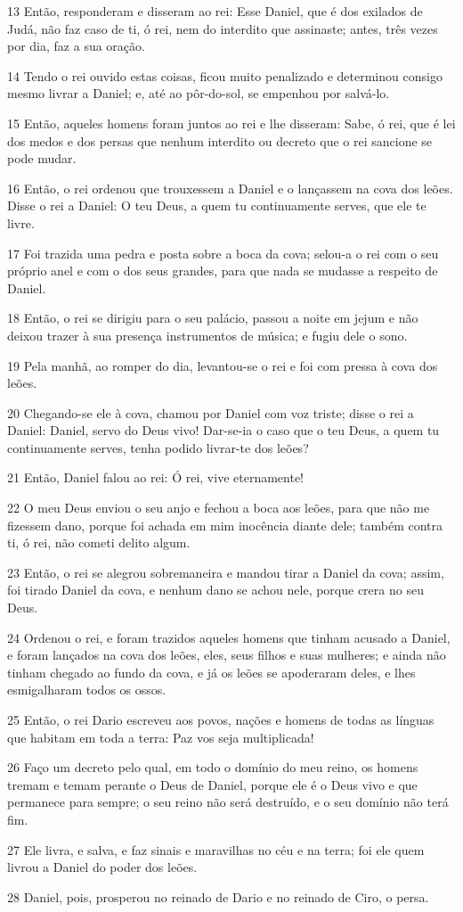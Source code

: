 \par 13 Então, responderam e disseram ao rei: Esse Daniel, que é dos exilados de Judá, não faz caso de ti, ó rei, nem do interdito que assinaste; antes, três vezes por dia, faz a sua oração.
\par 14 Tendo o rei ouvido estas coisas, ficou muito penalizado e determinou consigo mesmo livrar a Daniel; e, até ao pôr-do-sol, se empenhou por salvá-lo.
\par 15 Então, aqueles homens foram juntos ao rei e lhe disseram: Sabe, ó rei, que é lei dos medos e dos persas que nenhum interdito ou decreto que o rei sancione se pode mudar.
\par 16 Então, o rei ordenou que trouxessem a Daniel e o lançassem na cova dos leões. Disse o rei a Daniel: O teu Deus, a quem tu continuamente serves, que ele te livre.
\par 17 Foi trazida uma pedra e posta sobre a boca da cova; selou-a o rei com o seu próprio anel e com o dos seus grandes, para que nada se mudasse a respeito de Daniel.
\par 18 Então, o rei se dirigiu para o seu palácio, passou a noite em jejum e não deixou trazer à sua presença instrumentos de música; e fugiu dele o sono.
\par 19 Pela manhã, ao romper do dia, levantou-se o rei e foi com pressa à cova dos leões.
\par 20 Chegando-se ele à cova, chamou por Daniel com voz triste; disse o rei a Daniel: Daniel, servo do Deus vivo! Dar-se-ia o caso que o teu Deus, a quem tu continuamente serves, tenha podido livrar-te dos leões?
\par 21 Então, Daniel falou ao rei: Ó rei, vive eternamente!
\par 22 O meu Deus enviou o seu anjo e fechou a boca aos leões, para que não me fizessem dano, porque foi achada em mim inocência diante dele; também contra ti, ó rei, não cometi delito algum.
\par 23 Então, o rei se alegrou sobremaneira e mandou tirar a Daniel da cova; assim, foi tirado Daniel da cova, e nenhum dano se achou nele, porque crera no seu Deus.
\par 24 Ordenou o rei, e foram trazidos aqueles homens que tinham acusado a Daniel, e foram lançados na cova dos leões, eles, seus filhos e suas mulheres; e ainda não tinham chegado ao fundo da cova, e já os leões se apoderaram deles, e lhes esmigalharam todos os ossos.
\par 25 Então, o rei Dario escreveu aos povos, nações e homens de todas as línguas que habitam em toda a terra: Paz vos seja multiplicada!
\par 26 Faço um decreto pelo qual, em todo o domínio do meu reino, os homens tremam e temam perante o Deus de Daniel, porque ele é o Deus vivo e que permanece para sempre; o seu reino não será destruído, e o seu domínio não terá fim.
\par 27 Ele livra, e salva, e faz sinais e maravilhas no céu e na terra; foi ele quem livrou a Daniel do poder dos leões.
\par 28 Daniel, pois, prosperou no reinado de Dario e no reinado de Ciro, o persa.

